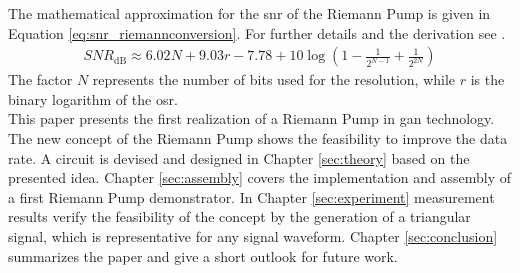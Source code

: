 \documentclass[journal]{IEEEtran}
\begin{document}
The mathematical approximation for the \gls{snr} of the Riemann Pump is given in Equation \ref{eq:snr_riemannconversion}.
For further details and the derivation see \cite{VeyracRivetDevalEtAl2016}.
%
\begin{align}
  \textit{SNR}_{\text{dB}} \approx 6.02N + 9.03r - 7.78 + 10 \log \left(1- \frac{1}{2^{N-1}} + \frac{1}{2^{2N}}\right)
    \label{eq:snr_riemannconversion}
\end{align}
%
The factor $N$ represents the number of bits used for the resolution, while $r$ is the binary logarithm of the \gls{osr}.
\\
This paper presents the first realization of a Riemann Pump in \gls{gan} technology.
The new concept of the Riemann Pump shows the feasibility to improve the data rate.
A circuit is devised and designed in Chapter \ref{sec:theory} based on the presented idea.
Chapter \ref{sec:assembly} covers the implementation and assembly of a first Riemann Pump demonstrator.
In Chapter \ref{sec:experiment} measurement results verify the feasibility of the concept by the generation of a triangular signal, which is representative for any signal waveform.
Chapter \ref{sec:conclusion} summarizes the paper and give a short outlook for future work.


%
%
\end{document}
